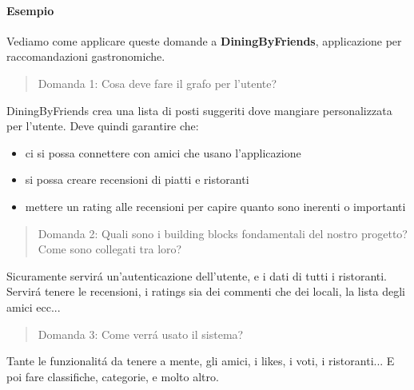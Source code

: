 \paragraph{Esempio} Vediamo come applicare queste domande a \textbf{DiningByFriends}, applicazione per raccomandazioni gastronomiche. 
\begin{quote}
    Domanda 1: Cosa deve fare il grafo per l'utente?
\end{quote}
DiningByFriends crea una lista di posti suggeriti dove mangiare personalizzata per l'utente. Deve quindi garantire che:
\begin{itemize}
    \item ci si possa connettere con amici che usano l'applicazione
    \item si possa creare recensioni di piatti e ristoranti
    \item mettere un rating alle recensioni per capire quanto sono inerenti o importanti
\end{itemize}
\begin{quote}
    Domanda 2: Quali sono i building blocks fondamentali del nostro progetto? Come sono collegati tra loro?
\end{quote}
Sicuramente servirá un'autenticazione dell'utente, e i dati di tutti i ristoranti. Servirá tenere le recensioni, i ratings sia dei commenti che dei locali, la lista degli amici ecc...
\begin{quote}
    Domanda 3:  Come verrá usato il sistema? 
\end{quote}
Tante le funzionalitá da tenere a mente, gli amici, i likes, i voti, i ristoranti... E poi fare classifiche, categorie, e molto altro.

\newpage

